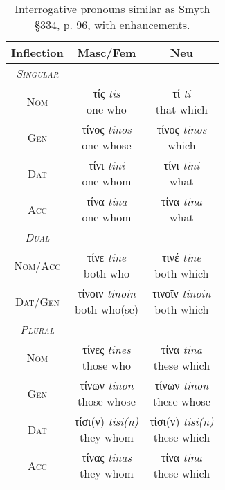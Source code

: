 \documentclass[10pt]{memoir}
\newcommand{\tsc}[1]{\textsc{#1}}
\newcommand{\grc}[1]{\fontspec{Inter}#1}
\newcommand{\trc}[1]{\textit{\fontspec{Tinos}#1}}
\begin{document}
    \begin{table}[H]
        \begin{tabular}{c|cc}
            \textbf{Inflection} & \textbf{Masc/Fem} & \textbf{Neu} \\
            \hline
            \emph{\tsc{Singular}} \\
            \tsc{Nom} & \makecell{\grc{τίς} \trc{tis} \\ \small one who} & \makecell{\grc{τί} \trc{ti} \\ \small that which } \\
            \tsc{Gen} & \makecell{\grc{τίνος} \trc{tinos} \\ \small one whose} & \makecell{\grc{τίνος} \trc{tinos} \\ \small which} \\
            \tsc{Dat} & \makecell{\grc{τίνι} \trc{tini} \\ \small one whom } & \makecell{\grc{τίνι} \trc{tini} \\ \small what} \\
            \tsc{Acc} & \makecell{\grc{τίνα} \trc{tina} \\ \small one whom} & \makecell{\grc{τίνα} \trc{tina} \\ \small what} \\
            \hline
            \emph{\tsc{Dual}} \\
            \tsc{Nom/Acc} & \makecell{\grc{τίνε} \trc{tine} \\ \small both who} & \makecell{\grc{τινέ} \trc{tine} \\ \small both which} \\
            \tsc{Dat/Gen} & \makecell{\grc{τίνοιν} \trc{tinoin} \\ \small both who(se)} & \makecell{\grc{τινοῖν} \trc{tinoin} \\ \small both which} \\
            \hline
            \emph{\tsc{Plural}} \\
            \tsc{Nom} & \makecell{\grc{τίνες} \trc{tines} \\ \small those who} & \makecell{\grc{τίνα} \trc{tina} \\ \small these which} \\
            \tsc{Gen} & \makecell{\grc{τίνων} \trc{tinōn} \\ \small those whose} & \makecell{\grc{τίνων} \trc{tinōn} \\ \small these whose} \\
            \tsc{Dat} & \makecell{\grc{τίσι(ν)} \trc{tisi(n)} \\ \small they whom} & \makecell{\grc{τίσι(ν)} \trc{tisi(n)}\\ \small these which} \\
            \tsc{Acc} & \makecell{\grc{τίνας} \trc{tinas} \\ \small they whom} & \makecell{\grc{τίνα} \trc{tina} \\ \small these which} \\
        \end{tabular}
        \caption{Interrogative pronouns similar as Smyth §334, p. 96, with enhancements.}
    \end{table}
\end{document}
